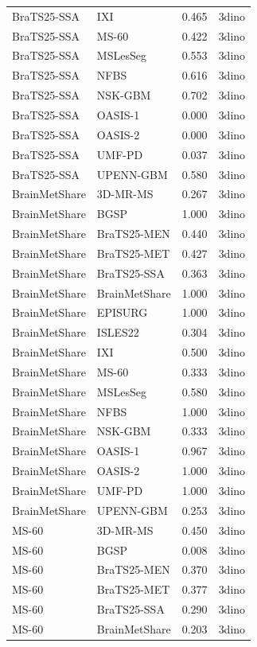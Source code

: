 \begin{tabular}{llrl}
BraTS25-SSA & IXI & 0.465 & 3dino \\
BraTS25-SSA & MS-60 & 0.422 & 3dino \\
BraTS25-SSA & MSLesSeg & 0.553 & 3dino \\
BraTS25-SSA & NFBS & 0.616 & 3dino \\
BraTS25-SSA & NSK-GBM & 0.702 & 3dino \\
BraTS25-SSA & OASIS-1 & 0.000 & 3dino \\
BraTS25-SSA & OASIS-2 & 0.000 & 3dino \\
BraTS25-SSA & UMF-PD & 0.037 & 3dino \\
BraTS25-SSA & UPENN-GBM & 0.580 & 3dino \\
BrainMetShare & 3D-MR-MS & 0.267 & 3dino \\
BrainMetShare & BGSP & 1.000 & 3dino \\
BrainMetShare & BraTS25-MEN & 0.440 & 3dino \\
BrainMetShare & BraTS25-MET & 0.427 & 3dino \\
BrainMetShare & BraTS25-SSA & 0.363 & 3dino \\
BrainMetShare & BrainMetShare & 1.000 & 3dino \\
BrainMetShare & EPISURG & 1.000 & 3dino \\
BrainMetShare & ISLES22 & 0.304 & 3dino \\
BrainMetShare & IXI & 0.500 & 3dino \\
BrainMetShare & MS-60 & 0.333 & 3dino \\
BrainMetShare & MSLesSeg & 0.580 & 3dino \\
BrainMetShare & NFBS & 1.000 & 3dino \\
BrainMetShare & NSK-GBM & 0.333 & 3dino \\
BrainMetShare & OASIS-1 & 0.967 & 3dino \\
BrainMetShare & OASIS-2 & 1.000 & 3dino \\
BrainMetShare & UMF-PD & 1.000 & 3dino \\
BrainMetShare & UPENN-GBM & 0.253 & 3dino \\
MS-60 & 3D-MR-MS & 0.450 & 3dino \\
MS-60 & BGSP & 0.008 & 3dino \\
MS-60 & BraTS25-MEN & 0.370 & 3dino \\
MS-60 & BraTS25-MET & 0.377 & 3dino \\
MS-60 & BraTS25-SSA & 0.290 & 3dino \\
MS-60 & BrainMetShare & 0.203 & 3dino \\

\end{tabular}
